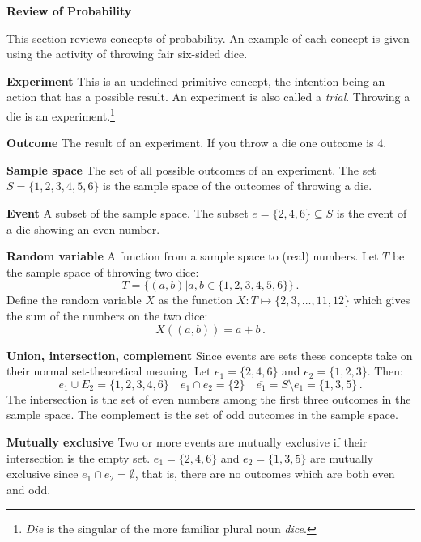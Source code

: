 

\newpage

\begin{center}
\textbf{\LARGE Review of Probability}
\end{center}

This section reviews concepts of probability. An example of each concept is given using the activity of throwing fair six-sided dice.

\textbf{Experiment} This is an undefined primitive concept, the intention being an action that has a possible result. An experiment is also called a \emph{trial}. Throwing a die is an experiment.\footnote{\emph{Die} is the singular of the more familiar plural noun \emph{dice}.}

\textbf{Outcome} The result of an experiment. If you throw a die one outcome is $4$.

\textbf{Sample space} The set of all possible outcomes of an experiment. The set $S=\{1,2,3,4,5,6\}$ is the sample space of the outcomes of throwing a die.

\textbf{Event} A subset of the sample space. The subset $e=\{2,4,6\}\subseteq S$ is the event of a die showing an even number.

\textbf{Random variable} A function from a sample space to (real) numbers. Let $T$ be the sample space of throwing two dice:
\[
T=\{(a,b)| a,b\in \{1,2,3,4,5,6\} \}\,.
\]
Define the random variable $X$ as the function $X:T \mapsto \{2,3,\ldots,11,12\}$ which gives the sum of the numbers on the two dice:
\begin{equation}\label{eq.sum}
X((a,b)) = a+b\,.
\end{equation}

\textbf{Union, intersection, complement} Since events are sets these concepts take on their normal set-theoretical meaning. Let  $e_1=\{2,4,6\}$ and $e_2=\{1,2,3\}$. Then:
\[
e_1 \cup E_2=\{1,2,3,4,6\}\quad e_1 \cap e_2=\{2\}\quad \overline{e_1} = S\setminus e_1=\{1,3,5\}\,.
\]
The intersection is the set of even numbers among the first three outcomes in the sample space. The complement is the set of odd outcomes in the sample space.

\textbf{Mutually exclusive} Two or more events are mutually exclusive if their intersection is the empty set. $e_1=\{2,4,6\}$ and $e_2=\{1,3,5\}$ are mutually exclusive since $e_1 \cap e_2=\emptyset$, that is, there are no outcomes which are both even and odd.

